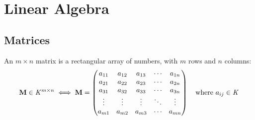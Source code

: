 \section{Linear Algebra}

\subsection{Matrices}

An \(m \times n\) matrix is a rectangular array of numbers, with \(m\) rows and
\(n\) columns:
\begin{equation*}
 \mathbf{M} \in \mathit{K}^{m \times n} \iff \mathbf{M} =
 \begin{pmatrix}
  a_{11} & a_{12} & a_{13} & \cdots & a_{1n} \\
  a_{21} & a_{22} & a_{23} & \cdots & a_{2n} \\
  a_{31} & a_{32} & a_{33} & \cdots & a_{3n} \\
  \vdots & \vdots & \vdots & \ddots & \vdots \\
  a_{m1} & a_{m2} & a_{m3} & \cdots & a_{mn}
 \end{pmatrix}
 \quad \text{where \(a_{ij} \in \mathit{K}\)}
\end{equation*}


